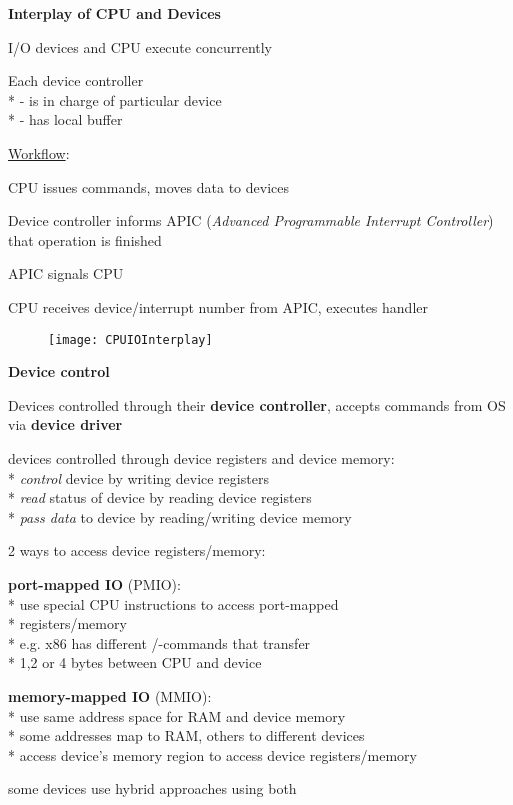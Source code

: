 \textbf{Interplay of CPU and Devices}
\begin{items}
	\item I/O devices and CPU execute concurrently
	\item Each device controller \\*
		- is in charge of particular device \\*
		- has local buffer
	\item \underline{Workflow}:
	\begin{enumeration}
		\item CPU issues commands, moves data to devices
		\item Device controller informs APIC (\emph{Advanced Programmable Interrupt Controller}) that operation is finished
		\item APIC signals CPU
		\item CPU receives device/interrupt number from APIC, executes handler
	\end{enumeration}
	\begin{figure}[H]\centering\label{CPUIOInterplay}\texttt{[image: CPUIOInterplay]}\end{figure}
\end{items}

\newpage 

\textbf{Device control}
\begin{items}
	\item Devices controlled through their \textbf{device controller}, accepts commands from OS via \textbf{device driver}
	\item devices controlled through device registers and device memory: \\*
		\emph{control} device by writing device registers \\*
		\emph{read} status of device by reading device registers \\*
		\emph{pass data} to device by reading/writing device memory
	\item 2 ways to access device registers/memory:
	\begin{enumeration}
		\item \textbf{port-mapped IO} (PMIO): \\*
			use special CPU instructions to access port-mapped \\* \phantom{x} registers/memory \\*
			e.g. x86 has different /-commands that transfer \\* \phantom{x} 1,2 or 4 bytes between CPU and device
		\item \textbf{memory-mapped IO} (MMIO): \\*
			use same address space for RAM and device memory \\*
			some addresses map to RAM, others to different devices \\*
			access device's memory region to access device registers/memory
	\end{enumeration}
	\item some devices use hybrid approaches using both
\end{items}

